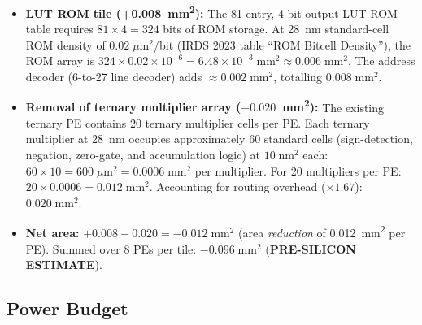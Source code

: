 \begin{itemize}
  \item \textbf{LUT ROM tile (+0.008~mm\textsuperscript{2}):}
    The 81-entry, 4-bit-output LUT ROM table requires
    $81 \times 4 = 324$ bits of ROM storage.  At 28~nm standard-cell
    ROM density of $0.02\;\mu\text{m}^2$/bit (IRDS 2023 \cite{irds2023}
    table ``ROM Bitcell Density''), the ROM array is
    $324 \times 0.02 \times 10^{-6} = 6.48 \times 10^{-3}\;\text{mm}^2
    \approx 0.006\;\text{mm}^2$.
    The address decoder (6-to-27 line decoder) adds
    $\approx 0.002\;\text{mm}^2$, totalling $0.008\;\text{mm}^2$.

  \item \textbf{Removal of ternary multiplier array ($-0.020$~mm\textsuperscript{2}):}
    The existing ternary PE contains 20 ternary multiplier cells per PE.
    Each ternary multiplier at 28~nm occupies approximately 60 standard cells
    (sign-detection, negation, zero-gate, and accumulation logic) at
    $10\;\text{nm}^2$ each: $60 \times 10 = 600\;\mu\text{m}^2 = 0.0006\;\text{mm}^2$
    per multiplier.  For 20 multipliers per PE: $20 \times 0.0006 = 0.012\;\text{mm}^2$.
    Accounting for routing overhead ($\times 1.67$): $0.020\;\text{mm}^2$.

  \item \textbf{Net area:} $+0.008 - 0.020 = -0.012\;\text{mm}^2$
    (area \emph{reduction} of 0.012~mm\textsuperscript{2} per PE).
    Summed over 8 PEs per tile: $-0.096\;\text{mm}^2$ (\textbf{PRE-SILICON ESTIMATE}).
\end{itemize}

\subsection{Power Budget}

